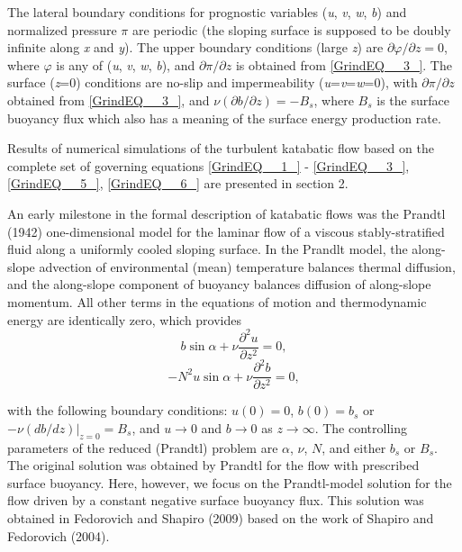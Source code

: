 \documentclass[gmd]{copernicus}
\begin{document}
The lateral boundary conditions for prognostic variables (\textit{u}, \textit{v}, \textit{w}, \textit{b}) and normalized pressure $\pi $ are periodic (the sloping surface is supposed to be doubly infinite along \textit{x} and \textit{y}). The upper boundary conditions (large \textit{z}) are $\partial \varphi /\partial z=0$, where $\varphi $ is any of (\textit{u}, \textit{v}, \textit{w}, \textit{b}), and $\partial \pi /\partial z$ is obtained from \eqref{GrindEQ__3_}. The surface (\textit{z}=0) conditions are no-slip and impermeability (\textit{u}=\textit{v}=\textit{w}=0), with $\partial \pi /\partial z$ obtained from \eqref{GrindEQ__3_}, and $\nu (\partial b/\partial z)=-B_{s} $, where $B_{s} $ is the surface buoyancy flux which also has a meaning of the surface energy production rate.

Results of numerical simulations of the turbulent katabatic flow based on the complete set of governing equations \eqref{GrindEQ__1_} - \eqref{GrindEQ__3_}, \eqref{GrindEQ__5_}, \eqref{GrindEQ__6_} are presented in section 2.

An early milestone in the formal description of katabatic flows was the Prandtl (1942) one-dimensional model for the laminar flow of a viscous stably-stratified fluid along a uniformly cooled sloping surface. In the Prandlt model, the along-slope advection of environmental (mean) temperature balances thermal diffusion, and the along-slope component of buoyancy balances diffusion of along-slope momentum. All other terms in the equations of motion and thermodynamic energy are identically zero, which provides
\begin{equation} \label{GrindEQ__7_} 
b\sin \alpha +\nu \frac{\partial ^{2} u}{\partial z^{2} } =0,  
\end{equation} 
\begin{equation} \label{GrindEQ__8_} 
-N^{2} u\sin \alpha +\nu \frac{\partial ^{2} b}{\partial z^{2} } =0,  
\end{equation} 

\noindent  with the following boundary conditions: $u(0)=0$, $b(0)=b_{s} $ or $\left. -\nu (db/dz)\right|_{z=0} =B_{s} $, and $u\to 0$ and $b\to 0$ as $z\to \infty $. The controlling parameters of the reduced  (Prandtl) problem are $\alpha $, $\nu $, $N$, and either $b_{s} $ or $B_{s} $.  The original solution was obtained by Prandtl for the flow with prescribed surface buoyancy. Here, however, we focus on the Prandtl-model solution for the flow driven by a constant negative surface buoyancy flux. This solution was obtained in Fedorovich and Shapiro (2009) based on the work of Shapiro and Fedorovich (2004). 
\end{document}
